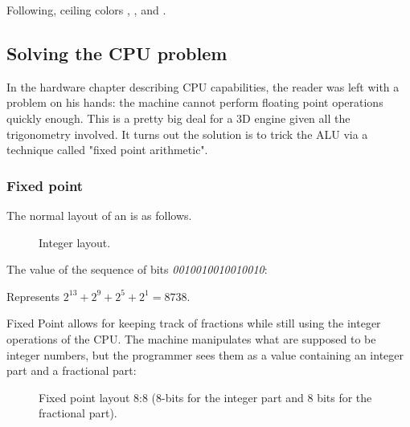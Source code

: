 Following, ceiling colors , ,  and .\\ 
\par
{}






\subsection{Solving the CPU problem}

In the hardware chapter describing CPU capabilities, the reader was left with a problem on his hands: the machine cannot perform floating point operations quickly enough. This is a pretty big deal for a 3D engine given all the trigonometry involved. It turns out the solution is to trick the ALU via a technique called "fixed point arithmetic".







\subsubsection{Fixed point}
The normal layout of an  is as follows.
\begin{figure}[H]
\centering
 
 \caption{Integer layout.} \label{fig:int_layout}
 \end{figure}
The value of the sequence of bits \emph{0010010010010010}:
\begin{figure}[H]
\centering

 \end{figure}

Represents $ 2^{13} + 2^9 + 2^5 + 2^1 =  8738 $.\\
 \par

Fixed Point allows for keeping track of fractions while still using the integer operations of the CPU. The machine manipulates what are supposed to be integer numbers, but the programmer sees them as a value containing an integer part and a fractional part:\\
\par
\begin{figure}[H]
 \centering
  
 \caption{Fixed point layout 8:8 (8-bits for the integer part and 8 bits for the fractional part).} \label{fig:mips}
\end{figure}

